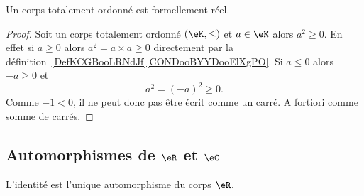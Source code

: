 \begin{proposition}
	Un corps totalement ordonné est formellement réel.
\end{proposition}

\begin{proof}
	Soit un corps totalement ordonné \( (\eK,\leq)\) et \( a\in \eK\) alors \( a^2\geq 0\). En effet si \( a\geq 0\) alors \( a^2=a\times a\geq 0\) directement par la définition~\ref{DefKCGBooLRNdJf}\ref{CONDooBYYDooElXgPO}. Si \( a\leq 0\) alors \( -a\geq 0\) et
	\begin{equation}
		a^2=(-a)^2\geq 0.
	\end{equation}
	Comme \( -1<0\), il ne peut donc pas être écrit comme un carré. A fortiori comme somme de carrés.
\end{proof}

\subsection{Automorphismes de \texorpdfstring{\(  \eR\)}{R} et \texorpdfstring{\(  \eC\)}{C}}

\begin{proposition}     \label{PROPooLLPMooIVanaO}
	L'identité est l'unique automorphisme du corps \( \eR\).
\end{proposition}

